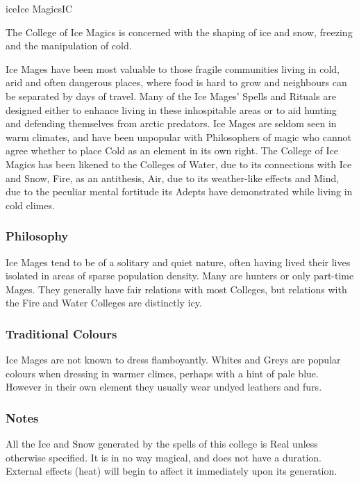 \begin{college}[1.5]{ice}{Ice Magics}{IC}

The College of Ice Magics is concerned with the shaping of ice and
snow, freezing and the manipulation of cold.

Ice Mages have been most valuable to those fragile communities living
in cold, arid and often dangerous places, where food is hard to grow
and neighbours can be separated by days of travel.  Many of the Ice
Mages' Spells and Rituals are designed either to enhance living in
these inhospitable areas or to aid hunting and defending themselves
from arctic predators.  Ice Mages are seldom seen in warm climates,
and have been unpopular with Philosophers of magic who cannot agree
whether to place Cold as an element in its own right.  The College of
Ice Magics has been likened to the Colleges of Water, due to its
connections with Ice and Snow, Fire, as an antithesis, Air, due to its
weather-like effects and Mind, due to the peculiar mental fortitude
its Adepts have demonstrated while living in cold climes.

\subsubsection{Philosophy}

Ice Mages tend to be of a solitary and quiet nature, often having
lived their lives isolated in areas of sparse population density.
Many are hunters or only part-time Mages.  They generally have fair
relations with most Colleges, but relations with the Fire and Water
Colleges are distinctly icy.

\subsubsection{Traditional Colours}

Ice Mages are not known to dress flamboyantly.  Whites and Greys are
popular colours when dressing in warmer climes, perhaps with a hint of
pale blue.  However in their own element they usually wear undyed
leathers and furs.

\subsubsection{Notes}

All the Ice and Snow generated by the spells of this college is Real
unless otherwise specified.  It is in no way magical, and does not
have a duration.  External effects (\eg heat) will begin to affect it
immediately upon its generation.


\end{college}
